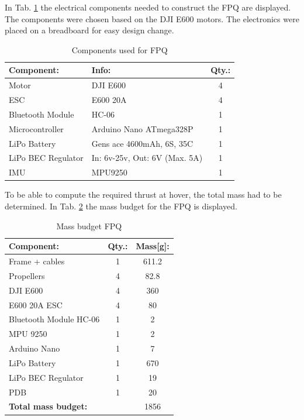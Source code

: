 In Tab. \ref{tab:CompFPQ} the electrical components needed to construct the FPQ are displayed. The components were chosen based on the DJI E600 motors. The electronics were placed on a breadboard for easy design change.
\begin{table}[H]
    \begin{center}
    \caption{Components used for FPQ} 
    \label{tab:CompFPQ} 
        \begin{tabular}{|l|l|c|}
            \hline 
            \cellcolor{white}\textbf{Component:} & \textbf{Info:} & \textbf{Qty.:}  \\ 
            \hline
            Motor & DJI E600  & 4 \\
            ESC & E600 20A & 4 \\
            Bluetooth Module & HC-06 & 1  \\
            Microcontroller & Arduino Nano  ATmega328P& 1 \\
            LiPo Battery & Gens ace 4600mAh, 6S, 35C & 1 \\
            LiPo BEC Regulator & In: 6v-25v, Out: 6V (Max. 5A)  & 1\\
            IMU & MPU9250 & 1 \\
            \hline
        \end{tabular}
    \end{center}
\end{table}

To be able to compute the required thrust at hover, the total mass had to be determined. In Tab. \ref{tab:WeightFPQ} the mass budget for the FPQ is displayed. 

\begin{table}[H]
    \begin{center}
    \caption{Mass budget FPQ} 
    \label{tab:WeightFPQ} 
        \begin{tabular}{|l|c|c|}
            \hline 
            \textbf{Component:} & \textbf{Qty.:} & \textbf{Mass[g]:}  \\ 
            \hline
            Frame + cables & 1 & 611.2\\
            Propellers & 4 & 82.8\\
            DJI E600  & 4 & 360 \\
            E600 20A ESC & 4 & 80 \\
            Bluetooth Module HC-06 & 1 & 2\\
            MPU 9250 & 1 & 2 \\
            Arduino Nano & 1 & 7 \\
            LiPo Battery & 1 & 670 \\
            LiPo BEC Regulator & 1 & 19 \\
            PDB & 1 & 20 \\\hline
            \textbf{Total mass budget:} & & 1856\\
            \hline
        \end{tabular}
    \end{center}
\end{table}

